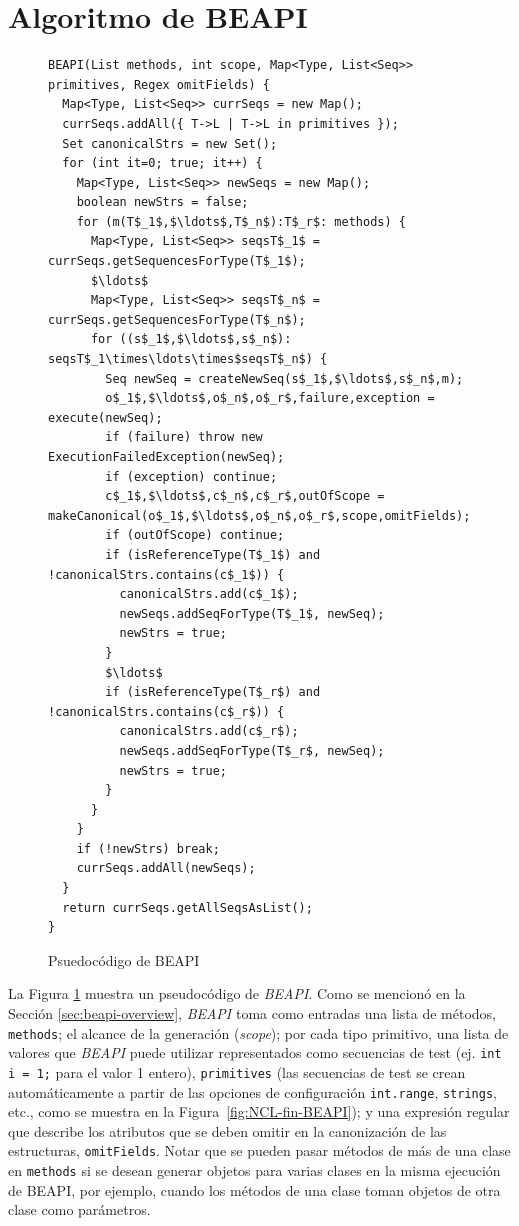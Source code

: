 \section{Algoritmo de BEAPI}
\label{sec:beapiTechnique}

\begin{figure}[ht]
\begin{lstlisting}
BEAPI(List methods, int scope, Map<Type, List<Seq>> primitives, Regex omitFields) {
  Map<Type, List<Seq>> currSeqs = new Map();
  currSeqs.addAll({ T->L | T->L in primitives });
  Set canonicalStrs = new Set();
  for (int it=0; true; it++) {
    Map<Type, List<Seq>> newSeqs = new Map();
    boolean newStrs = false;
    for (m(T$_1$,$\ldots$,T$_n$):T$_r$: methods) {
      Map<Type, List<Seq>> seqsT$_1$ = currSeqs.getSequencesForType(T$_1$);
      $\ldots$ 
      Map<Type, List<Seq>> seqsT$_n$ = currSeqs.getSequencesForType(T$_n$);
      for ((s$_1$,$\ldots$,s$_n$): seqsT$_1\times\ldots\times$seqsT$_n$) {
        Seq newSeq = createNewSeq(s$_1$,$\ldots$,s$_n$,m);
        o$_1$,$\ldots$,o$_n$,o$_r$,failure,exception = execute(newSeq);
        if (failure) throw new ExecutionFailedException(newSeq);
        if (exception) continue;
        c$_1$,$\ldots$,c$_n$,c$_r$,outOfScope = makeCanonical(o$_1$,$\ldots$,o$_n$,o$_r$,scope,omitFields);
        if (outOfScope) continue;
        if (isReferenceType(T$_1$) and !canonicalStrs.contains(c$_1$)) {
          canonicalStrs.add(c$_1$);
          newSeqs.addSeqForType(T$_1$, newSeq);
          newStrs = true;
        }
        $\ldots$
        if (isReferenceType(T$_r$) and !canonicalStrs.contains(c$_r$)) {
          canonicalStrs.add(c$_r$);
          newSeqs.addSeqForType(T$_r$, newSeq);
          newStrs = true;
        }
      }
    }
    if (!newStrs) break;
    currSeqs.addAll(newSeqs);
  }
  return currSeqs.getAllSeqsAsList();
}
\end{lstlisting}
\caption{Psuedocódigo de \textsf{BEAPI}}
\label{fig:beapi-algorithm}
\end{figure}


La Figura \ref{fig:beapi-algorithm} muestra un pseudocódigo de \emph{BEAPI}. 
Como se mencionó en la Sección \ref{sec:beapi-overview}, \emph{BEAPI} toma como
entradas una lista de métodos, \texttt{methods}; el alcance de la generación
(\emph{scope}); por cada tipo primitivo, una lista de valores que \emph{BEAPI}
puede utilizar representados como secuencias de test (ej. \texttt{int i = 1;} para
el valor 1 entero),
\texttt{primitives} (las secuencias de test se crean automáticamente a partir de las opciones de
configuración \texttt{int.range}, \texttt{strings}, etc., como se muestra en la Figura~\ref{fig:NCL-fin-BEAPI}); 
y una expresión regular que describe los atributos que se deben omitir en la canonización de las estructuras, \texttt{omitFields}. 
Notar que se pueden pasar métodos de más de una clase en \texttt{methods} si se desean generar objetos para varias clases en la misma ejecución de \textsf{BEAPI},
por ejemplo, cuando los métodos de una clase toman objetos de otra clase como parámetros. 

